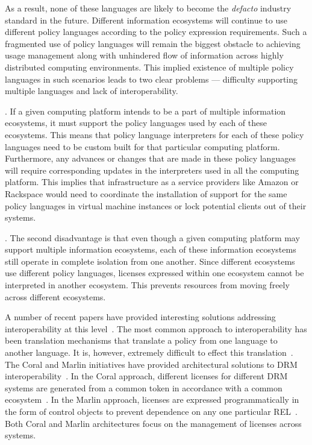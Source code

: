 As a result, none of these languages are likely to become the {\em defacto} industry standard in the future.  Different information ecosystems will continue to use different policy languages according to the policy expression requirements. Such a fragmented use of policy languages will remain the biggest obstacle to achieving usage management along with unhindered flow of information across highly distributed computing environments. This implied existence of multiple policy languages in such scenarios leads to two clear problems --- difficulty supporting multiple languages and lack of interoperability.

.
If a given computing platform intends to be a part of multiple information ecosystems, it must support the policy languages used by each of these ecosystems. This means that policy language interpreters for each of these policy languages need to be custom built for that particular computing platform. Furthermore, any advances or changes that are made in these policy languages will require corresponding updates in the interpreters used in all the computing platform.  This implies that infrastructure as a service providers like Amazon or Rackspace would need to coordinate the installation of support for the same policy languages in virtual machine instances or lock potential clients out of their systems.

.
The second disadvantage is that even though a given computing platform may support multiple information ecosystems, each of these information ecosystems still operate in complete isolation from one another.  Since different ecosystems use different policy languages, licenses expressed within one ecosystem cannot be interpreted in another ecosystem. This prevents resources from moving freely across different ecosystems. 

A number of recent papers have provided interesting solutions addressing interoperability at this level~\cite{marlin,coral,KoLaMaMi:04,SaShUe:04,ScTaWo:04}. The most common approach to interoperability has been translation mechanisms that translate a policy from one language to another language.  It is, however,  extremely difficult to effect this translation~\cite{HeJa:05}. The Coral and Marlin initiatives have provided architectural solutions to DRM interoperability~\cite{marlin,coral}. In the Coral approach, different licenses for different DRM systems are generated from a common token in accordance with a common ecosystem~\cite{coral}. In the Marlin approach, licenses are expressed programmatically in the form of control objects to prevent dependence on any one particular REL~\cite{marlin}. Both Coral and Marlin architectures focus on the management of licenses across systems.\\ 

